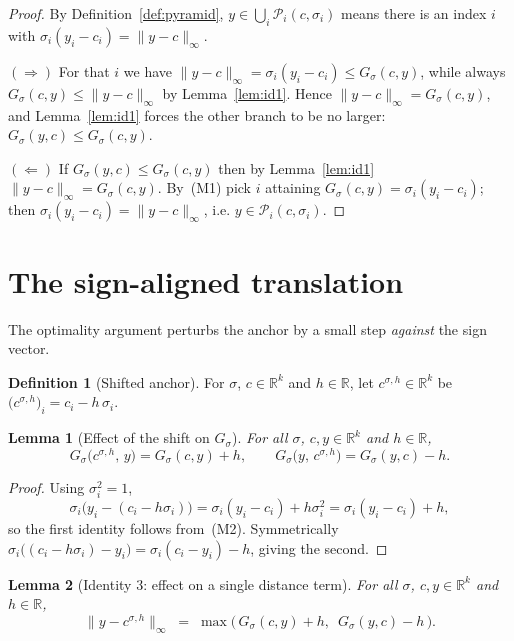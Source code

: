 \documentclass[11pt]{article}
\theoremstyle{plain}
\newtheorem{lemma}{Lemma}
\theoremstyle{definition}
\newtheorem{definition}{Definition}
\theoremstyle{remark}
\newcommand{\R}{\mathbb{R}}
\newcommand{\Rk}{\R^{k}}
\newcommand{\linf}[1]{\lVert #1 \rVert_{\infty}}
\newcommand{\Pyr}{\mathcal{P}}
\newcommand{\sgn}{\sigma}
\begin{document}
\begin{proof}
By Definition~\ref{def:pyramid}, $y\in\bigcup_i\Pyr_i(c,\sgn_i)$ means there is
an index $i$ with $\sgn_i(y_i-c_i)=\linf{y-c}$.

$(\Rightarrow)$ For that $i$ we have
$\linf{y-c}=\sgn_i(y_i-c_i)\le G_\sgn(c,y)$, while always
$G_\sgn(c,y)\le\linf{y-c}$ by Lemma~\ref{lem:id1}. Hence
$\linf{y-c}=G_\sgn(c,y)$, and Lemma~\ref{lem:id1} forces the other branch to be
no larger: $G_\sgn(y,c)\le G_\sgn(c,y)$.

$(\Leftarrow)$ If $G_\sgn(y,c)\le G_\sgn(c,y)$ then by Lemma~\ref{lem:id1}
$\linf{y-c}=G_\sgn(c,y)$. By~(M1) pick $i$ attaining
$G_\sgn(c,y)=\sgn_i(y_i-c_i)$; then $\sgn_i(y_i-c_i)=\linf{y-c}$, i.e.
$y\in\Pyr_i(c,\sgn_i)$.
\end{proof}

\section{The sign-aligned translation}

The optimality argument perturbs the anchor by a small step \emph{against} the
sign vector.

\begin{definition}[Shifted anchor]\label{def:shift}
For $\sgn$, $c\in\Rk$ and $h\in\R$, let $c^{\sgn,h}\in\Rk$ be
$\bigl(c^{\sgn,h}\bigr)_i = c_i-h\,\sgn_i$.
\end{definition}

\begin{lemma}[Effect of the shift on $G_\sgn$]\label{lem:shiftG}
For all $\sgn$, $c,y\in\Rk$ and $h\in\R$,
\[
  G_\sgn\!\bigl(c^{\sgn,h},\,y\bigr)=G_\sgn(c,y)+h,
  \qquad
  G_\sgn\!\bigl(y,\,c^{\sgn,h}\bigr)=G_\sgn(y,c)-h.
\]
\end{lemma}

\begin{proof}
Using $\sgn_i^2=1$,
\[
  \sgn_i\bigl(y_i-(c_i-h\sgn_i)\bigr)=\sgn_i(y_i-c_i)+h\sgn_i^2=\sgn_i(y_i-c_i)+h,
\]
so the first identity follows from~(M2). Symmetrically
$\sgn_i\bigl((c_i-h\sgn_i)-y_i\bigr)=\sgn_i(c_i-y_i)-h$, giving the second.
\end{proof}

\begin{lemma}[Identity 3: effect on a single distance term]\label{lem:id3}
For all $\sgn$, $c,y\in\Rk$ and $h\in\R$,
\[
  \linf{y-c^{\sgn,h}}
  \;=\;\max\bigl(\,G_\sgn(c,y)+h,\ \;G_\sgn(y,c)-h\,\bigr).
\]
\end{lemma}
\end{document}
